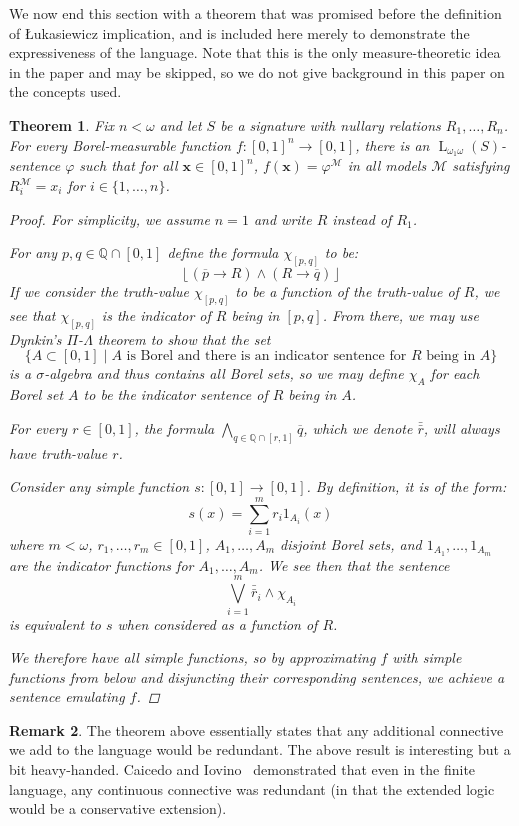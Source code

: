 \documentclass{amsart}
\newtheorem{theorem}{Theorem}[section]
\theoremstyle{definition}
\newtheorem{remark}[theorem]{Remark}
\numberwithin{equation}{theorem}
\renewcommand{\phi}{\varphi}
\newcommand{\Q}{\mathbb{Q}}
\newcommand{\V}{\mathbf}
\newcommand{\where}{\mid}
\newcommand{\strict}[1]{{\left\lfloor#1\right\rfloor}}
\newcommand{\rat}[1]{{\overline{#1}}}
\newcommand{\num}[1]{{\bar{\bar{#1}}}}
\newcommand{\narrow}[1]{\xrightarrow{#1}}
\renewcommand{\to}{\narrow{}}
\newcommand{\baselang}{\operatorname{L}}
\newcommand{\lang}{\baselang_{\omega_1\omega}}
\begin{document}
We now end this section with a theorem that was promised before the definition of {\L}ukasiewicz implication, and is included here merely to demonstrate the expressiveness of the language.
Note that this is the only measure-theoretic idea in the paper and may be skipped, so we do not give background in this paper on the concepts used.
\begin{theorem}\label{thm:expressive-logic}
  Fix $n<\omega$ and let $S$ be a signature with nullary relations $R_1,\dots,R_n$.
  For every Borel-measurable function $f:[0,1]^n\to[0,1]$, there is an $\lang(S)$-sentence $\phi$ such that for all $\V x\in[0,1]^n$, $f(\V x)=\phi^\mathcal M$ in all models $\mathcal M$ satisfying $R^\mathcal M_i=x_i$ for $i\in\{1,\dots,n\}$.
  \begin{proof}
    For simplicity, we assume $n=1$ and write $R$ instead of $R_1$.
    
    For any $p,q\in\Q\cap[0,1]$ define the formula $\chi_{[p,q]}$ to be:
    \[
      \strict{(\rat p\to R)\wedge (R\to\rat q)}
    \]
    If we consider the truth-value $\chi_{[p,q]}$ to be a function of the truth-value of $R$, we see that $\chi_{[p,q]}$ is the indicator of $R$ being in $[p,q]$.
    From there, we may use Dynkin's $\Pi$-$\Lambda$ theorem to show that the set
    \[
      \{A\subset[0,1]\where \text{$A$ is Borel and there is an indicator sentence for $R$ being in $A$}\}
    \]
    is a $\sigma$-algebra and thus contains all Borel sets, so we may define $\chi_A$ for each Borel set $A$ to be the indicator sentence of $R$ being in $A$.
    
    For every $r\in[0,1]$, the formula $\bigwedge_{q\in\Q\cap[r,1]}\rat q$, which we denote $\num r$, will always have truth-value $r$.
    
    Consider any simple function $s:[0,1]\to[0,1]$.
    By definition, it is of the form:
    \[
      s(x)=\sum_{i=1}^m r_i 1_{A_i}(x)
    \]
    where $m<\omega$, $r_1,\dots,r_m\in[0,1]$, $A_1,\dots,A_m$ disjoint Borel sets, and $1_{A_1},\dots,1_{A_m}$ are the indicator functions for $A_1,\dots,A_m$.
    We see then that the sentence
    \[
      \bigvee_{i=1}^m \num{r}_i\wedge\chi_{A_i}
    \]
    is equivalent to $s$ when considered as a function of $R$.
    
    We therefore have all simple functions, so by approximating $f$ with simple functions from below and disjuncting their corresponding sentences, we achieve a sentence emulating $f$.
  \end{proof}
\end{theorem}
\begin{remark}
  The theorem above essentially states that any additional connective we add to the language would be redundant.
  The above result is interesting but a bit heavy-handed.
  Caicedo and Iovino~\cite{caicedo2012omitting} demonstrated that even in the finite language, any continuous connective was redundant (in that the extended logic would be a conservative extension).
\end{remark}
\end{document}
